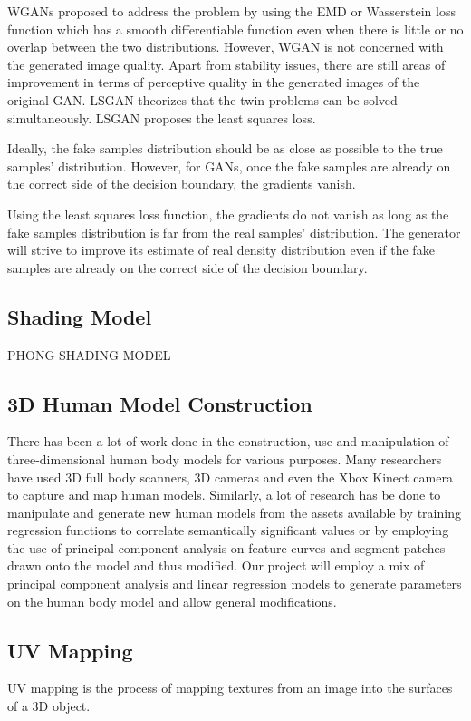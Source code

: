 \documentclass{article}
\begin{document}
WGANs proposed to address the problem by using the EMD or Wasserstein loss function which has a smooth differentiable function even when there is little or no overlap between the two distributions. However, WGAN is not concerned with the generated image quality. Apart from stability issues, there are still areas of improvement in terms of perceptive quality in the generated images of the original GAN. LSGAN theorizes that the twin problems can be solved simultaneously.
LSGAN proposes the least squares loss. 

Ideally, the fake samples distribution should be as close as possible to the true samples' distribution. However, for GANs, once the fake samples are already on the correct side of the decision boundary, the gradients vanish.

 Using the least squares loss function, the gradients do not vanish as long as the fake samples distribution is far from the real samples' distribution. The generator will strive to improve its estimate of real density distribution even if the fake samples are already on the correct side of the decision boundary.
    \subsection{Shading Model}
    PHONG SHADING MODEL
    \subsection{3D Human Model Construction }
There has been a lot of work done in the construction, use and manipulation of three-dimensional human body models for various purposes. Many researchers have used 3D full body scanners, 3D cameras and even the Xbox Kinect camera to capture and map human models. Similarly, a lot of research has be done to manipulate and generate new human models from the assets available by training regression functions to correlate semantically significant values or by employing the use of principal component analysis on feature curves and segment patches drawn onto the model and thus modified. Our project will employ a mix of principal component analysis and linear regression models to generate parameters on the human body model and allow general modifications.

\subsection {UV Mapping}
UV mapping is the process of mapping textures from an image into the surfaces of a 3D object. 
\end{document}
